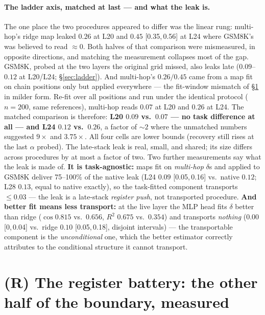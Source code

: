 \documentclass{article}
\newcommand{\ci}[2]{{[#1,\,#2]}}
\begin{document}
\paragraph{The ladder axis, matched at last --- and what the leak is.} The one place the two
procedures appeared to differ was the linear rung: multi-hop's ridge map leaked $0.26$ at L20 and
$0.45$ \ci{0.35}{0.56} at L24 where GSM8K's was believed to read ${\approx}0$. Both halves of that
comparison were mismeasured, in opposite directions, and matching the measurement collapses most
of the gap. GSM8K, probed at the two layers the original grid missed, also leaks late
($0.09$--$0.12$ at L20/L24; \S\ref{sec:ladder}). And multi-hop's $0.26/0.45$ came from a map fit
on chain positions only but applied everywhere --- the fit-window mismatch of
\S\ref{sec:battery} in milder form. Re-fit over all positions and run under the identical
protocol ($n{=}200$, same references), multi-hop reads $0.07$ at L20 and $0.26$ at L24. The
matched comparison is therefore: \textbf{L20 $0.09$ vs.\ $0.07$ --- no task difference at all ---
and L24 $0.12$ vs.\ $0.26$}, a factor of ${\sim}2$ where the unmatched numbers suggested $9\times$
and $3.75\times$. All four cells are lower bounds (recovery still rises at the last $\alpha$
probed). The late-stack leak is real, small, and shared; its size differs across procedures by at
most a factor of two.
Two further measurements say what the leak is made of. \textbf{It is task-agnostic:} maps fit on
\emph{multi-hop} $\delta$s and applied to GSM8K deliver 75--100\% of the native leak (L24 $0.09$
\ci{0.05}{0.16} vs.\ native $0.12$; L28 $0.13$, equal to native exactly), so the task-fitted
component transports ${\leq}0.03$ --- the leak is a late-stack \emph{register push}, not
transported procedure. \textbf{And better fit means less transport:} at the live layer the MLP head
fits $\delta$ better than ridge ($\cos 0.815$ vs.\ $0.656$, $R^2$ $0.675$ vs.\ $0.354$) and
transports \emph{nothing} ($0.00$ \ci{0}{0.04} vs.\ ridge $0.10$ \ci{0.05}{0.18}, disjoint
intervals) --- the transportable component is the \emph{unconditional} one, which the better
estimator correctly attributes to the conditional structure it cannot transport.

\section{(R) The register battery: the other half of the boundary, measured}
\label{sec:battery}
\end{document}
